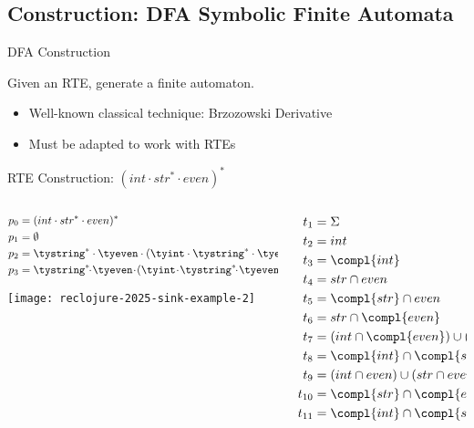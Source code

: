 \subsection{Construction: DFA Symbolic Finite Automata}

{  
\begin{frame}{ DFA Construction}

  Given an RTE, generate a finite automaton.

  \begin{itemize}
  \item Well-known classical technique: Brzozowski Derivative
  \item Must be adapted to work with RTEs
  \end{itemize}
\end{frame}
}



\begin{frame}{RTE Construction: $(int \cdot str^{*} \cdot even)^{*}$}
  \begin{columns}
    \begin{column}{0.5\textwidth}
      \begin{align*}
        p_0 &= (int \cdot str^{*} \cdot even)^{*}\\
        p_1 &= \emptyset\\
        p_2 &= \tystring^{*} \cdot \tyeven \cdot (\tyint \cdot \tystring^{*} \cdot \tyeven)^{*}\\
        p_3 &= \tystring^{*}\!\!\cdot\! \tyeven\!\cdot\! (\tyint\! \cdot\! \tystring^{*}\!\!\cdot\! \tyeven)^{*}\! \reor (\tyint\! \cdot\! \tystring^{*}\!\!\cdot\!\! \tyeven)^{*}
      \end{align*}



      \texttt{[image: reclojure-2025-sink-example-2]}
    \end{column}
    \begin{column}{0.5\textwidth}
      \begin{align*}
        t_1 &= \Sigma\\
        t_2 &= int  \\
        t_3 &= \compl{int}\\
        t_4 &= str \cap even\\
        t_5 &= \compl{str} \cap even\\
        t_6 &= str \cap \compl{even}\\
        t_7 &= (int \cap \compl{even}) \cup (str \cap \compl{even})\\
        t_8   &=\compl{int} \cap \compl{str} \cap even\\
        t_9 &=(int \cap even) \cup (str \cap even)\\
        t_{10} &=\compl{str} \cap \compl{even}\\
        t_{11} &=\compl{int} \cap \compl{str} \cap \compl{even}
      \end{align*}
    \end{column}
  \end{columns}
\end{frame}

